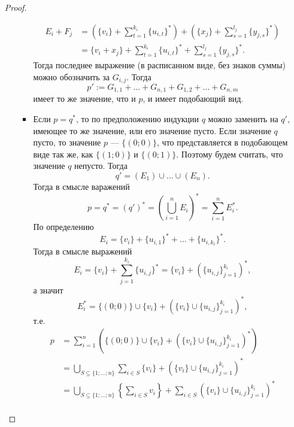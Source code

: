 \documentclass[12pt,a4paper]{article}
\begin{document}
\begin{problem}{8}
\begin{enumerate}
\begin{proof}
\begin{enumerate}
\begin{itemize}
\begin{align*}
                                        E_i + F_j
                                        &= \left(\{v_i\} + \sum_{t=1}^{k_i} \{u_{i, t}\}^*\right) + \left(\{x_j\} + \sum_{s=1}^{l_j} \{y_{j, s}\}^*\right)\\
                                        &= \{v_i + x_j\} + \sum_{t=1}^{k_i} \{u_{i, t}\}^* + \sum_{s=1}^{l_j} \{y_{j, s}\}^*.
                                    \end{align*}
                                    Тогда последнее выражение (в расписанном виде, без знаков суммы) можно обозначить за $G_{i, j}$. Тогда
                                    \[p' := G_{1, 1} + \dots + G_{n, 1} + G_{1, 2} + \dots + G_{n, m}\]
                                    имеет то же значение, что и $p$, и имеет подобающий вид.
                                \item Если $p = q^*$, то по предположению индукции $q$ можно заменить на $q'$, имеющее то же значение, или его значение пусто. Если значение $q$ пусто, то значение $p$ --- $\{(0; 0)\}$, что представляется в подобающем виде так же, как $\{(1; 0)\}$ и $\{(0; 1)\}$. Поэтому будем считать, что значение $q$ непусто. Тогда
                                    \[q' = (E_1) \cup \dots \cup (E_n).\]
                                    Тогда в смысле варажений
                                    \[p = q^* = (q')^* = \left(\bigcup_{i=1}^n E_i\right)^* = \sum_{i=1}^n E_i^*.\]
                                    По определению
                                    \[E_i = \{v_i\} + \{u_{i, 1}\}^* + \dots + \{u_{i, k_i}\}^*.\]
                                    Тогда в смысле выражений
                                    \[E_i = \{v_i\} + \sum_{j=1}^{k_i} \{u_{i, j}\}^* = \{v_i\} + (\{u_{i, j}\}_{j=1}^{k_i})^*,\]
                                    а значит
                                    \[E_i^* = \{(0; 0)\} \cup \{v_i\} + (\{v_i\} \cup \{u_{i, j}\}_{j=1}^{k_i})^*,\]
                                    т.е.
                                    \begin{align*}
                                        p
                                        &= \sum_{i=1}^n (\{(0; 0)\} \cup \{v_i\} + (\{v_i\} \cup \{u_{i, j}\}_{j=1}^{k_i})^*)\\
                                        &= \bigcup_{S \subseteq \{1; \dots; n\}} \sum_{i \in S} \{v_i\} + (\{v_i\} \cup \{u_{i, j}\}_{j=1}^{k_i})^*\\
                                        &= \bigcup_{S \subseteq \{1; \dots; n\}} \left\{\sum_{i \in S} v_i\right\} + \sum_{i \in S} (\{v_i\} \cup \{u_{i, j}\}_{j=1}^{k_i})^*\\

\end{align*}
\end{itemize}
\end{enumerate}
\end{proof}
\end{enumerate}
\end{problem}
\end{document}

